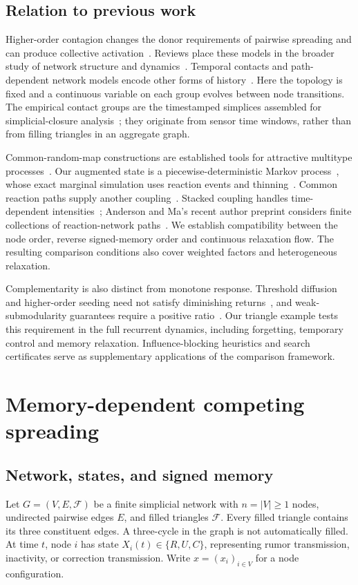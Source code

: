 \documentclass[final,5p,times,twocolumn,sort&compress]{elsarticle}
\theoremstyle{plain}
\newcommand{\Fset}{\mathcal{F}}
\begin{document}
\subsection{Relation to previous work}
Higher-order contagion changes the donor requirements of pairwise spreading and can produce collective activation~\cite{iacopini2019,neuhauser2020}. Reviews place these models in the broader study of network structure and dynamics~\cite{battiston2020,battiston2021,bick2023,boccaletti2023}. Temporal contacts and path-dependent network models encode other forms of history~\cite{holme2012,lambiotte2019}. Here the topology is fixed and a continuous variable on each group evolves between node transitions. The empirical contact groups are the timestamped simplices assembled for simplicial-closure analysis~\cite{benson2018}; they originate from sensor time windows, rather than from filling triangles in an aggregate graph.

Common-random-map constructions are established tools for attractive multitype processes~\cite{stover2010}. Our augmented state is a piecewise-deterministic Markov process~\cite{davis1984}, whose exact marginal simulation uses reaction events and thinning~\cite{gillespie1977,lewis1979}. Common reaction paths supply another coupling~\cite{anderson2007,anderson2012}. Stacked coupling handles time-dependent intensities~\cite{andersonyuan2019}; Anderson and Ma's recent author preprint considers finite collections of reaction-network paths~\cite{andersonma2026}. We establish compatibility between the node order, reverse signed-memory order and continuous relaxation flow. The resulting comparison conditions also cover weighted factors and heterogeneous relaxation.

Complementarity is also distinct from monotone response. Threshold diffusion and higher-order seeding need not satisfy diminishing returns~\cite{schoenebeck2022,zhang2024,qu2025}, and weak-submodularity guarantees require a positive ratio~\cite{das2018}. Our triangle example tests this requirement in the full recurrent dynamics, including forgetting, temporary control and memory relaxation. Influence-blocking heuristics and search certificates serve as supplementary applications of the comparison framework.

\section{Memory-dependent competing spreading}
\subsection{Network, states, and signed memory}
Let $G=(V,E,\Fset)$ be a finite simplicial network with $n=|V|\ge1$ nodes, undirected pairwise edges $E$, and filled triangles $\Fset$. Every filled triangle contains its three constituent edges. A three-cycle in the graph is not automatically filled. At time $t$, node $i$ has state $X_i(t)\in\{R,U,C\}$, representing rumor transmission, inactivity, or correction transmission. Write $x=(x_i)_{i\in V}$ for a node configuration.
\end{document}
